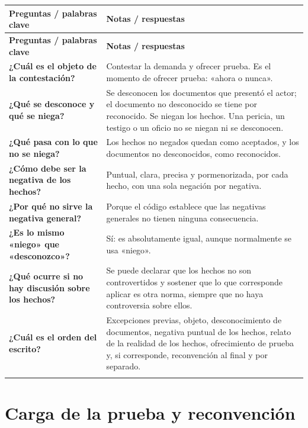 \documentclass[12pt,oneside]{book}
\newenvironment{cornell}{%
  \begin{longtable}{>{\raggedright\arraybackslash}p{0.26\textwidth}>{\raggedright\arraybackslash}p{0.64\textwidth}}
  \toprule
  \textbf{Preguntas / palabras clave} & \textbf{Notas / respuestas} \\
  \midrule
  \endfirsthead
  \toprule
  \textbf{Preguntas / palabras clave} & \textbf{Notas / respuestas} \\
  \midrule
  \endhead
}{%
  \bottomrule
  \end{longtable}
}
\newcommand{\cornellresumen}[1]{%
  \midrule
  \multicolumn{2}{p{\dimexpr0.90\textwidth+2\tabcolsep\relax}}{\textbf{Resumen:} #1} \\
}
\begin{document}
\begin{cornell}
\textbf{¿Cuál es el objeto de la contestación?} &
Contestar la demanda y ofrecer prueba. Es el momento de ofrecer prueba: «ahora o nunca». \\
\addlinespace
\textbf{¿Qué se desconoce y qué se niega?} &
Se desconocen los documentos que presentó el actor; el documento no desconocido se tiene por reconocido. Se niegan los hechos. Una pericia, un testigo o un oficio no se niegan ni se desconocen. \\
\addlinespace
\textbf{¿Qué pasa con lo que no se niega?} &
Los hechos no negados quedan como aceptados, y los documentos no desconocidos, como reconocidos. \\
\addlinespace
\textbf{¿Cómo debe ser la negativa de los hechos?} &
Puntual, clara, precisa y pormenorizada, por cada hecho, con una sola negación por negativa. \\
\addlinespace
\textbf{¿Por qué no sirve la negativa general?} &
Porque el código establece que las negativas generales no tienen ninguna consecuencia. \\
\addlinespace
\textbf{¿Es lo mismo «niego» que «desconozco»?} &
Sí: es absolutamente igual, aunque normalmente se usa «niego». \\
\addlinespace
\textbf{¿Qué ocurre si no hay discusión sobre los hechos?} &
Se puede declarar que los hechos no son controvertidos y sostener que lo que corresponde aplicar es otra norma, siempre que no haya controversia sobre ellos. \\
\addlinespace
\textbf{¿Cuál es el orden del escrito?} &
Excepciones previas, objeto, desconocimiento de documentos, negativa puntual de los hechos, relato de la realidad de los hechos, ofrecimiento de prueba y, si corresponde, reconvención al final y por separado. \\
\cornellresumen{La contestación se presenta «ahora o nunca»: contesta la demanda y ofrece prueba. Debe desconocer los documentos del actor y negar los hechos de manera puntual, pormenorizada y categórica, porque lo no negado queda reconocido y la negativa general carece de efectos; luego se expone la realidad de los hechos y se ofrece la prueba.}
\end{cornell}

\chapter[Carga de la prueba y reconvención]{Carga de la prueba y reconvención}
\end{document}
